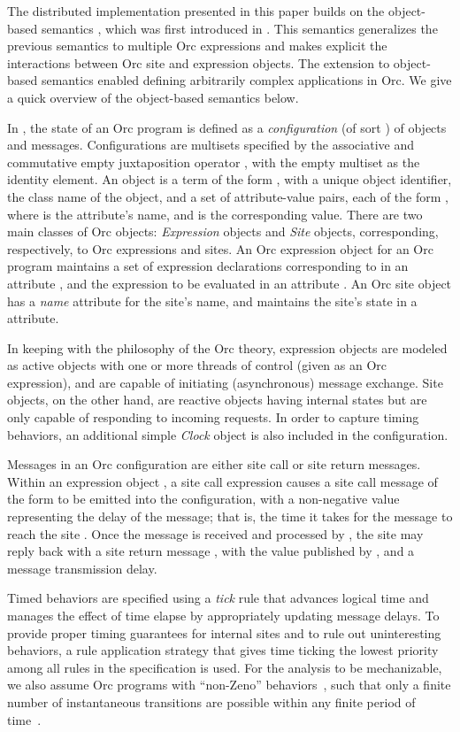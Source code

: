 \documentclass{eptcs}
\begin{document}
The distributed implementation presented in this paper builds on the object-based semantics , which was first introduced in \cite{AlTurkiM07WWV}. This semantics generalizes the previous semantics to multiple Orc expressions and makes explicit the interactions between Orc site and expression objects. 
The extension to object-based semantics enabled defining arbitrarily complex applications in Orc. We give a quick overview of the object-based semantics below.


In , the state of an Orc program is defined as a \emph{configuration} (of sort ) of objects and messages. Configurations are multisets specified by the associative and commutative empty juxtaposition operator , with the empty multiset  as the identity element. An object is a term of the form , with  a unique object identifier,  the class name of the object, and  a set of attribute-value pairs, each of the form , where  is the attribute's name, and  is the corresponding value. There are two main classes of Orc objects: \emph{Expression} objects and \emph{Site} objects, corresponding, respectively, to Orc expressions and sites.  An Orc expression object for an Orc program  maintains a set of expression declarations corresponding to  in an attribute , and the expression  to be evaluated in an attribute . An Orc site object has a \emph{name} attribute for the site's name, and maintains the site's state in a  attribute.

In keeping with the philosophy of the Orc theory, expression objects are modeled as active objects with one or more threads of control (given as an Orc expression), and are capable 
of initiating (asynchronous) message exchange. Site objects, on the other hand, are reactive objects having internal states but are only capable of responding to incoming requests. In order to capture timing behaviors, an additional simple \emph{Clock} object is also included in the configuration.

Messages in an Orc configuration are either site call or site return messages. Within an expression object , a site call expression  causes a site call message of the form  to be emitted into the configuration, with  a non-negative value representing the delay of the message; that is, the time it takes for the message to reach the site . Once the message is received and processed by , the site may reply back with a site return message , with  the value published by , and  a message transmission delay.


Timed behaviors are specified using a \emph{tick} rule that advances logical time and manages the effect of time elapse by appropriately updating message delays. To provide proper timing guarantees for internal sites and to rule out uninteresting behaviors, a rule application strategy that gives time ticking the lowest priority among all rules in the specification is used. For the analysis to be mechanizable, we also assume Orc programs with ``non-Zeno'' behaviors~\cite{OlveczkyM2007}, such that only a finite number of instantaneous transitions are possible within any finite  period of time~\cite{AlTurkiM07WWV}.
 
\end{document}
